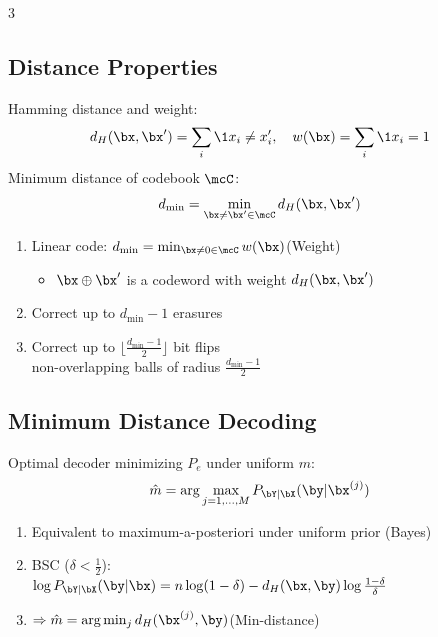 \documentclass[12pt, a4paper]{article}
\begin{document}
\begin{multicols*}{3}
\subsection{Distance Properties}
Hamming distance and weight:
\begin{align*}
  d_H(\bx,\bx')=\sum_i\1{x_i\neq x'_i},\quad w(\bx)=\sum_i\1{x_i=1}
\end{align*}
Minimum distance of codebook $\mcC$:
\begin{align*}
  d_{\min}=\min_{\bx\neq\bx'\in\mcC}d_H(\bx,\bx')
\end{align*}
\begin{enumerate}[\roman*.]
  \item Linear code: $d_{\min}=\min_{\bx\neq 0\in\mcC}w(\bx)$\hfill(Weight)
    \begin{itemize}[leftmargin=*]\vspace{3pt}
      \item $\bx\oplus\bx'$ is a codeword with weight $d_H(\bx,\bx')$
    \end{itemize}
  \item Correct up to $d_{\min}-1$ erasures
  \item Correct up to $\lfloor\tfrac{d_{\min}-1}{2}\rfloor$ bit flips\\non-overlapping balls of radius $\tfrac{d_{\min}-1}{2}$
\end{enumerate}

\subsection{Minimum Distance Decoding}
Optimal decoder minimizing $P_e$ under uniform $m$:
\begin{align*}
  \hat m=\arg\max_{j=1,\dots,M}P_{\bY|\bX}(\by|\bx^{(j)})
\end{align*}
\begin{enumerate}[\roman*.]
  \item Equivalent to maximum-a-posteriori under uniform prior (Bayes)
  \item BSC ($\delta<\tfrac12$):\\$\log P_{\bY|\bX}(\by|\bx)=n\log(1-\delta)-d_H(\bx,\by)\log\tfrac{1-\delta}{\delta}$
  \item $\Rightarrow\hat m=\arg\min_j d_H(\bx^{(j)},\by)$\hfill(Min-distance)
\end{enumerate}


\end{multicols*}
\end{document}
